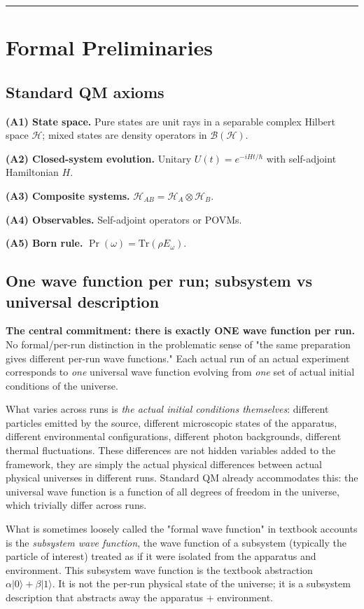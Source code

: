 \documentclass[11pt,a4paper]{article}
\begin{document}
\medskip\hrule\medskip

\section{Formal Preliminaries}

\subsection{Standard QM axioms}

\textbf{(A1) State space.} Pure states are unit rays in a separable complex Hilbert space $\mathcal{H}$; mixed states are density operators in $\mathcal{B}(\mathcal{H})$.

\textbf{(A2) Closed-system evolution.} Unitary $U(t) = e^{-iHt/\hbar}$ with self-adjoint Hamiltonian $H$.

\textbf{(A3) Composite systems.} $\mathcal{H}_{AB} = \mathcal{H}_A \otimes \mathcal{H}_B$.

\textbf{(A4) Observables.} Self-adjoint operators or POVMs.

\textbf{(A5) Born rule.} $\Pr(\omega) = \mathrm{Tr}(\rho E_\omega)$.

\subsection{One wave function per run; subsystem vs universal description}

\textbf{The central commitment: there is exactly ONE wave function per run.} No formal/per-run distinction in the problematic sense of "the same preparation gives different per-run wave functions." Each actual run of an actual experiment corresponds to \emph{one} universal wave function evolving from \emph{one} set of actual initial conditions of the universe.

What varies across runs is \emph{the actual initial conditions themselves}: different particles emitted by the source, different microscopic states of the apparatus, different environmental configurations, different photon backgrounds, different thermal fluctuations. These differences are not hidden variables added to the framework, they are simply the actual physical differences between actual physical universes in different runs. Standard QM already accommodates this: the universal wave function is a function of all degrees of freedom in the universe, which trivially differ across runs.

What is sometimes loosely called the "formal wave function" in textbook accounts is the \emph{subsystem wave function}, the wave function of a subsystem (typically the particle of interest) treated as if it were isolated from the apparatus and environment. This subsystem wave function is the textbook abstraction $\alpha|0\rangle + \beta|1\rangle$. It is not the per-run physical state of the universe; it is a subsystem description that abstracts away the apparatus + environment.
\end{document}
